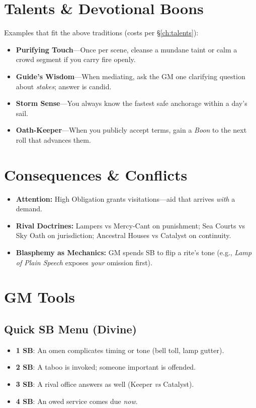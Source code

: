 \begin{multicols}{2}
\section{Talents \& Devotional Boons}
Examples that fit the above traditions (costs per \S\ref{ch:talents}):
\begin{itemize}
  \item \textbf{Purifying Touch}—Once per scene, cleanse a mundane taint or calm a crowd segment if you carry fire openly.
  \item \textbf{Guide’s Wisdom}—When mediating, ask the GM one clarifying question about \emph{stakes}; answer is candid.
  \item \textbf{Storm Sense}—You always know the fastest safe anchorage within a day’s sail.
  \item \textbf{Oath-Keeper}—When you publicly accept terms, gain a \emph{Boon} to the next roll that advances them.
\end{itemize}

\section{Consequences \& Conflicts}
\begin{itemize}
  \item \textbf{Attention:} High Obligation grants visitations—aid that arrives \emph{with} a demand.
  \item \textbf{Rival Doctrines:} Lampers vs Mercy-Cant on punishment; Sea Courts vs Sky Oath on jurisdiction; Ancestral Houses vs Catalyst on continuity.
  \item \textbf{Blasphemy as Mechanics:} GM spends SB to flip a rite’s tone (e.g., \emph{Lamp of Plain Speech} exposes \emph{your} omission first).
\end{itemize}

\section{GM Tools}
\subsection*{Quick SB Menu (Divine)}
\begin{itemize}
  \item \textbf{1 SB}: An omen complicates timing or tone (bell toll, lamp gutter).
  \item \textbf{2 SB}: A taboo is invoked; someone important is offended.
  \item \textbf{3 SB}: A rival office answers as well (Keeper \emph{vs} Catalyst).
  \item \textbf{4 SB}: An owed service comes due \emph{now}.
\end{itemize}


\end{multicols}
